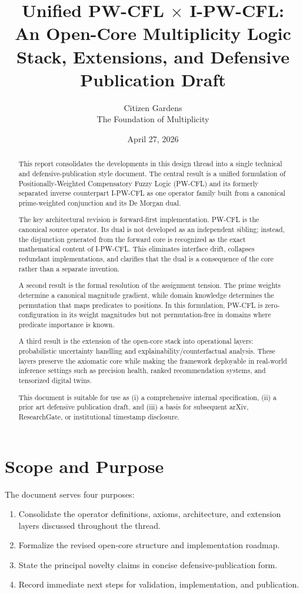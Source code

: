 \documentclass[11pt]{article}
\title{\textbf{Unified PW-CFL $\times$ I-PW-CFL:}\\
An Open-Core Multiplicity Logic Stack, Extensions, and Defensive Publication Draft}
\author{Citizen Gardens \\ The Foundation of Multiplicity}
\date{April 27, 2026}
\begin{document}
\maketitle

\begin{abstract}
This report consolidates the developments in this design thread into a single technical and defensive-publication style document. The central result is a unified formulation of Positionally-Weighted Compensatory Fuzzy Logic (PW-CFL) and its formerly separated inverse counterpart I-PW-CFL as one operator family built from a canonical prime-weighted conjunction and its De Morgan dual.

The key architectural revision is forward-first implementation. PW-CFL is the canonical source operator. Its dual is not developed as an independent sibling; instead, the disjunction generated from the forward core is recognized as the exact mathematical content of I-PW-CFL. This eliminates interface drift, collapses redundant implementations, and clarifies that the dual is a consequence of the core rather than a separate invention.

A second result is the formal resolution of the assignment tension. The prime weights determine a canonical magnitude gradient, while domain knowledge determines the permutation that maps predicates to positions. In this formulation, PW-CFL is zero-configuration in its weight magnitudes but not permutation-free in domains where predicate importance is known.

A third result is the extension of the open-core stack into operational layers: probabilistic uncertainty handling and explainability/counterfactual analysis. These layers preserve the axiomatic core while making the framework deployable in real-world inference settings such as precision health, ranked recommendation systems, and tensorized digital twins.

This document is suitable for use as (i) a comprehensive internal specification, (ii) a prior art defensive publication draft, and (iii) a basis for subsequent arXiv, ResearchGate, or institutional timestamp disclosure.
\end{abstract}

\newpage
\tableofcontents

\section{Scope and Purpose}
The document serves four purposes:
\begin{enumerate}[label=\arabic*.]
  \item Consolidate the operator definitions, axioms, architecture, and extension layers discussed throughout the thread.
  \item Formalize the revised open-core structure and implementation roadmap.
  \item State the principal novelty claims in concise defensive-publication form.
  \item Record immediate next steps for validation, implementation, and publication.
\end{enumerate}
\end{document}
